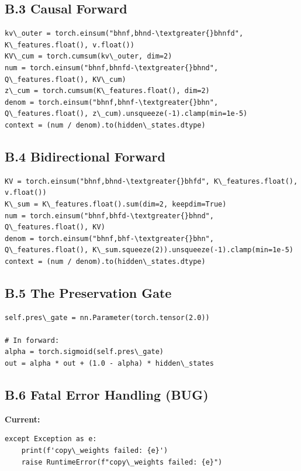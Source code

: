 \subsection{B.3 Causal Forward}

\begin{lstlisting}
kv\_outer = torch.einsum("bhnf,bhnd-\textgreater{}bhnfd", K\_features.float(), v.float())
KV\_cum = torch.cumsum(kv\_outer, dim=2)
num = torch.einsum("bhnf,bhnfd-\textgreater{}bhnd", Q\_features.float(), KV\_cum)
z\_cum = torch.cumsum(K\_features.float(), dim=2)
denom = torch.einsum("bhnf,bhnf-\textgreater{}bhn", Q\_features.float(), z\_cum).unsqueeze(-1).clamp(min=1e-5)
context = (num / denom).to(hidden\_states.dtype)
\end{lstlisting}

\subsection{B.4 Bidirectional Forward}

\begin{lstlisting}
KV = torch.einsum("bhnf,bhnd-\textgreater{}bhfd", K\_features.float(), v.float())
K\_sum = K\_features.float().sum(dim=2, keepdim=True)
num = torch.einsum("bhnf,bhfd-\textgreater{}bhnd", Q\_features.float(), KV)
denom = torch.einsum("bhnf,bhf-\textgreater{}bhn", Q\_features.float(), K\_sum.squeeze(2)).unsqueeze(-1).clamp(min=1e-5)
context = (num / denom).to(hidden\_states.dtype)
\end{lstlisting}

\subsection{B.5 The Preservation Gate}

\begin{lstlisting}
self.pres\_gate = nn.Parameter(torch.tensor(2.0))

# In forward:
alpha = torch.sigmoid(self.pres\_gate)
out = alpha * out + (1.0 - alpha) * hidden\_states
\end{lstlisting}

\subsection{B.6 Fatal Error Handling (BUG)}

\textbf{Current:}
\begin{lstlisting}
except Exception as e:
    print(f'copy\_weights failed: {e}')
    raise RuntimeError(f"copy\_weights failed: {e}")
\end{lstlisting}

